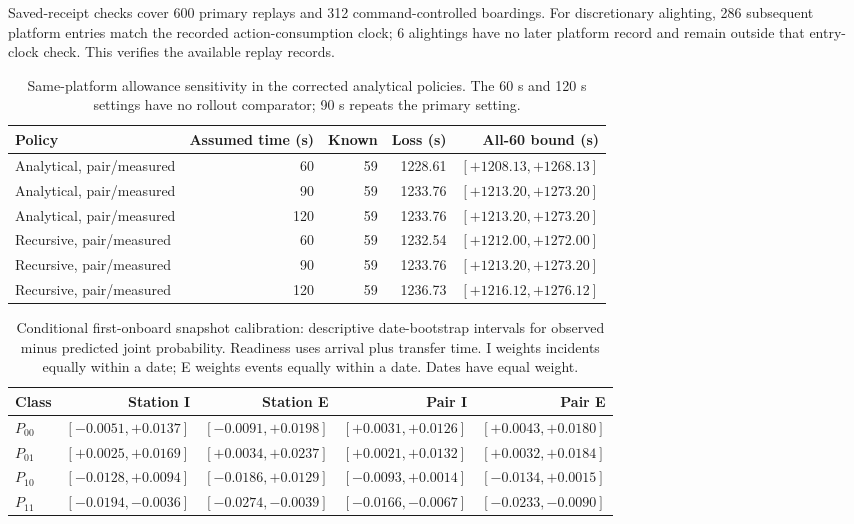 Saved-receipt checks cover 600 primary replays and 312 command-controlled boardings. For discretionary alighting, 286 subsequent platform entries match the recorded action-consumption clock; 6 alightings have no later platform record and remain outside that entry-clock check. This verifies the available replay records.

\begin{table}[ht]
\centering\small\setlength{\tabcolsep}{4pt}
\caption{Same-platform allowance sensitivity in the corrected analytical policies. The 60 s and 120 s settings have no rollout comparator; 90 s repeats the primary setting.}
\begin{tabular}{p{}rrrr}
\toprule
Policy & Assumed time (s) & Known & Loss (s) & All-60 bound (s) \\
\midrule
Analytical, pair/measured & 60 & 59 & 1228.61 & $[+1208.13,+1268.13]$ \\
Analytical, pair/measured & 90 & 59 & 1233.76 & $[+1213.20,+1273.20]$ \\
Analytical, pair/measured & 120 & 59 & 1233.76 & $[+1213.20,+1273.20]$ \\
Recursive, pair/measured & 60 & 59 & 1232.54 & $[+1212.00,+1272.00]$ \\
Recursive, pair/measured & 90 & 59 & 1233.76 & $[+1213.20,+1273.20]$ \\
Recursive, pair/measured & 120 & 59 & 1236.73 & $[+1216.12,+1276.12]$ \\
\bottomrule
\end{tabular}
\end{table}

\begin{table}[ht]
\centering\small\setlength{\tabcolsep}{4pt}
\caption{Conditional first-onboard snapshot calibration: descriptive date-bootstrap intervals for observed minus predicted joint probability. Readiness uses arrival plus transfer time. I weights incidents equally within a date; E weights events equally within a date. Dates have equal weight.}
\begin{tabular}{lrrrr}
\toprule
Class & Station I & Station E & Pair I & Pair E \\
\midrule
$P_{00}$ & $[-0.0051,+0.0137]$ & $[-0.0091,+0.0198]$ & $[+0.0031,+0.0126]$ & $[+0.0043,+0.0180]$ \\
$P_{01}$ & $[+0.0025,+0.0169]$ & $[+0.0034,+0.0237]$ & $[+0.0021,+0.0132]$ & $[+0.0032,+0.0184]$ \\
$P_{10}$ & $[-0.0128,+0.0094]$ & $[-0.0186,+0.0129]$ & $[-0.0093,+0.0014]$ & $[-0.0134,+0.0015]$ \\
$P_{11}$ & $[-0.0194,-0.0036]$ & $[-0.0274,-0.0039]$ & $[-0.0166,-0.0067]$ & $[-0.0233,-0.0090]$ \\
\bottomrule
\end{tabular}
\end{table}

